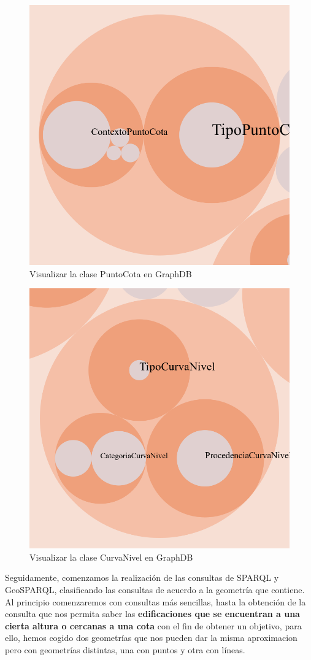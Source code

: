 \begin{figure}[H]
	\centering
	\includegraphics[width=0.4\linewidth]{imagenes/capitulo5/class-hierarchy-TFM-3}
	\caption{Visualizar la clase PuntoCota en GraphDB}
	\label{fig:class-hierarchy-tfm-3}
\end{figure}

\begin{figure}[H]
	\centering
	\includegraphics[width=0.4\linewidth]{imagenes/capitulo5/class-hierarchy-TFM-4}
	\caption{Visualizar la clase CurvaNivel en GraphDB}
	\label{fig:class-hierarchy-tfm-4}
\end{figure}

Seguidamente, comenzamos la realización de las consultas de SPARQL y GeoSPARQL, clasificando las consultas de acuerdo a la geometría que contiene. Al principio comenzaremos con consultas más sencillas, hasta la obtención de la consulta que nos permita saber las \textbf{edificaciones que se encuentran a una cierta altura o cercanas a una cota} con el fin de obtener un objetivo, para ello, hemos cogido dos geometrías que nos pueden dar la misma aproximacion pero con geometrías distintas, una con puntos y otra con líneas.




